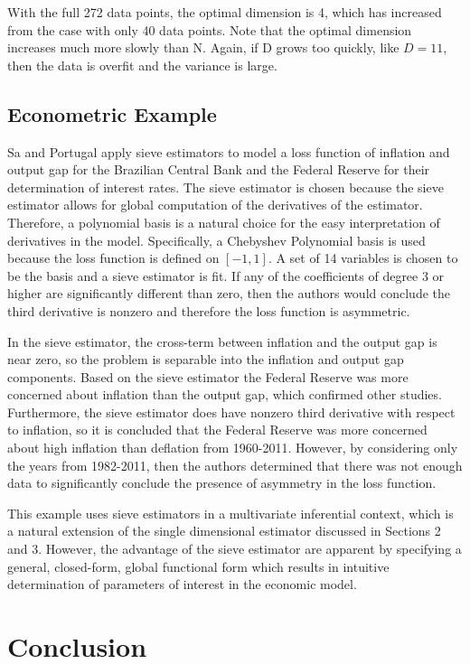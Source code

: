 \documentclass[12pt]{article}  %
\begin{document}
With the full 272 data points, the optimal dimension is 4, which has increased from the case with only 40 data points. Note that the optimal dimension increases much more slowly than N. Again, if D grows too quickly,  like $D = 11$, then the data is overfit and the variance is large. 


\subsection{Econometric Example}

Sa and Portugal \cite{Sa} apply sieve estimators to model a loss function of inflation and output gap for the Brazilian Central Bank and the Federal Reserve for their determination of interest rates.  The sieve estimator is chosen because the sieve estimator allows for global computation of the derivatives of the estimator. Therefore, a polynomial basis is a natural choice for the easy interpretation of derivatives in the model. Specifically, a Chebyshev Polynomial basis is used because the loss function is defined on $[-1,1]$.  A set of 14 variables is chosen to be the basis and a sieve estimator is fit. If any of the coefficients of degree 3 or higher are significantly different than zero, then the authors would conclude the third derivative is nonzero and therefore the loss function is asymmetric. 

In the sieve estimator, the cross-term between inflation and the output gap is near zero, so the problem is separable into the inflation and output gap components. Based on the sieve estimator the Federal Reserve was more concerned about inflation than the output gap, which confirmed other studies. Furthermore, the sieve estimator does have nonzero third derivative with respect to inflation, so it is concluded that the Federal Reserve was more concerned about high inflation than deflation from 1960-2011. However, by considering only the years from 1982-2011, then the authors determined that there was not enough data to significantly conclude the presence of asymmetry in the loss function.  

This example uses sieve estimators in a multivariate inferential context, which is a natural extension of the single dimensional estimator discussed in Sections 2 and 3. However, the advantage of the sieve estimator are apparent by specifying a general, closed-form, global functional form which results in intuitive determination of parameters of interest in the economic model. 

\section{Conclusion}
\end{document}
